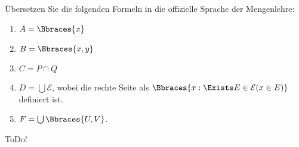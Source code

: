 
\begin{exercise}[14]

Übersetzen Sie die folgenden Formeln in die offizielle Sprache der Mengenlehre:

\begin{enumerate}[label = \alph*.]
    \item $A = \Bbraces{x}$
    \item $B = \Bbraces{x, y}$
    \item $C = P \cap Q$
    \item $D = \bigcup \mathcal{E}$, wobei die rechte Seite als $\Bbraces{x: \Exists E \in \mathcal{E}(x \in E)}$ definiert ist.
    \item $F = \bigcup \Bbraces{U, V}$.
\end{enumerate}

\end{exercise}


\begin{solution}

ToDo!

\end{solution}

